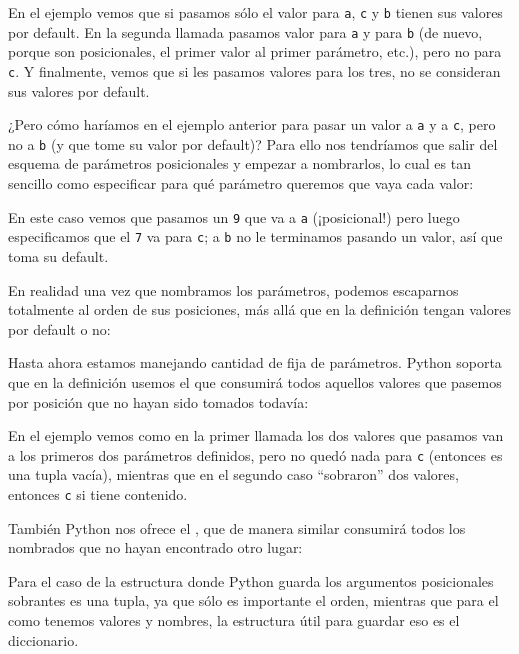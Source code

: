 
En el ejemplo vemos que si pasamos sólo el valor para \verb|a|, \verb|c| y \verb|b| tienen sus valores por default. En la segunda llamada pasamos valor para \verb|a| y para \verb|b| (de nuevo, porque son posicionales, el primer valor al primer parámetro, etc.), pero no para \verb|c|. Y finalmente, vemos que si les pasamos valores para los tres, no se consideran sus valores por default.

¿Pero cómo haríamos en el ejemplo anterior para pasar un valor a \verb|a| y a \verb|c|, pero no a \verb|b| (y que tome su valor por default)? Para ello nos tendríamos que salir del esquema de parámetros posicionales y empezar a nombrarlos, lo cual es tan sencillo como especificar para qué parámetro queremos que vaya cada valor:


En este caso vemos que pasamos un \verb|9| que va a \verb|a| (¡posicional!) pero luego especificamos que el \verb|7| va para \verb|c|; a \verb|b| no le terminamos pasando un valor, así que toma su default.

En realidad una vez que nombramos los parámetros, podemos escaparnos totalmente al orden de sus posiciones, más allá que en la definición tengan valores por default o no:


Hasta ahora estamos manejando cantidad de fija de parámetros. Python soporta que en la definición usemos el \mip{*} que consumirá todos aquellos valores que pasemos por posición que no hayan sido tomados todavía:


En el ejemplo vemos como en la primer llamada los dos valores que pasamos van a los primeros dos parámetros definidos, pero no quedó nada para \verb|c| (entonces es una tupla vacía), mientras que en el segundo caso ``sobraron'' dos valores, entonces \verb|c| si tiene contenido.

También Python nos ofrece el \mip{**}, que de manera similar consumirá todos los nombrados que no hayan encontrado otro lugar:


Para el caso de \mip{*} la estructura donde Python guarda los argumentos posicionales sobrantes es una tupla, ya que sólo es importante el orden, mientras que para el \mip{**} como tenemos valores y nombres, la estructura útil para guardar eso es el diccionario.

